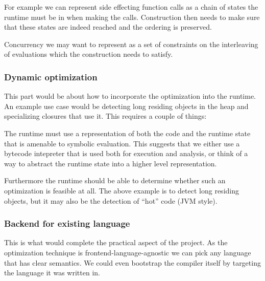 \documentclass[a4paper]{article}
\begin{document}
For example we can represent side effecting function calls as a chain of states the runtime must be in when making the calls. Construction then needs to make sure that these states are indeed reached and the ordering is preserved.

Concurrency we may want to represent as a set of constraints on the interleaving of evaluations which the construction needs to satisfy.

\subsubsection*{Dynamic optimization}

This part would be about how to incorporate the optimization into the runtime. An example use case would be detecting long residing objects in the heap and specializing closures that use it. This requires a couple of things:

The runtime must use a representation of both the code and the runtime state that is amenable to symbolic evaluation. This suggests that we either use a bytecode intepreter that is used both for execution and analysis, or think of a way to abstract the runtime state into a higher level representation.

Furthermore the runtime should be able to determine whether such an optimization is feasible at all. The above example is to detect long residing objects, but it may also be the detection of ``hot'' code (JVM style).

\subsubsection*{Backend for existing language}

This is what would complete the practical aspect of the project. As the optimization technique is frontend-language-agnostic we can pick any language that has clear semantics. We could even bootstrap the compiler itself by targeting the language it was written in.



\end{document}
